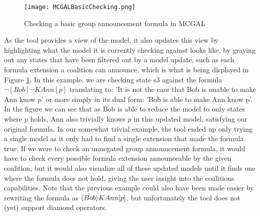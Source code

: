 \begin{figure}[H]
	\label{fig:basicGalChecking}
	\caption{Checking a basic group announcement formula in MCGAL}
	\texttt{[image: MCGALBasicChecking.png]}
\end{figure}

As the tool provides a view of the model, it also updates this view by highlighting what the model it is currently checking against looks like, by graying out any states that have been filtered out by a model update, such as each formula extension a coalition can announce, which is what is being displayed in Figure \ref{fig:basicGalChecking}. In this example, we are checking state s3 against the formula $\neg [Bob]\neg KAnn[p]$ translating to: 'It is not the case that Bob is unable to make Ann know $p$' or more simply in its dual form: 'Bob is able to make Ann know p'. In the figure we can see that as Bob is able to reduce the model to only states where $p$ holds, Ann also trivially knows $p$ in this updated model, satisfying our original formula. In our somewhat trivial example, the tool ended up only trying a single model as it only had to find a single extension that made the formula true. If we were to check an unnegated group announcement formula, it would have to check every possible formula extension announceable by the given coalition, but it would also visualize all of these updated models until it finds one where the formula does not hold, giving the user insight into the coalitions capabilities. Note that the previous example could also have been made easier by rewriting the formula as $\langle Bob\rangle KAnn[p]$, but unfortunately the tool does not (yet) support diamond operators. 
